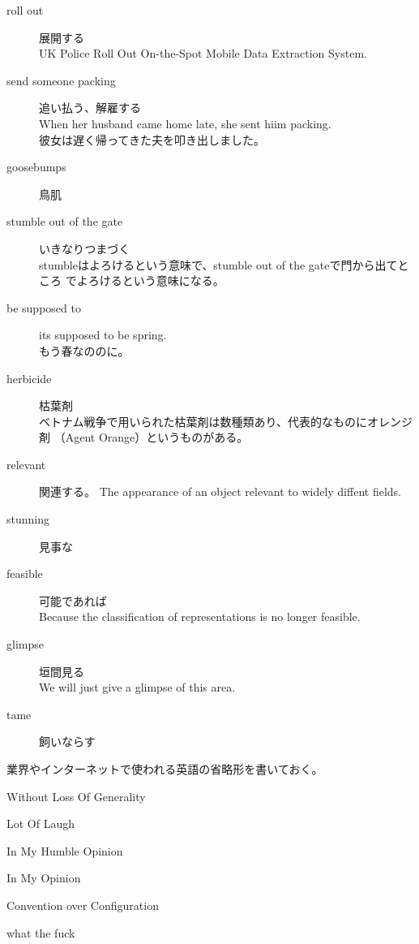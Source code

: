 \begin{description}
		\item[roll out] 展開する \\
		UK Police Roll Out On-the-Spot Mobile Data Extraction System.
		\item[send someone packing] 追い払う、解雇する \\
		When her husband came home late, she sent hiim packing. \\
		彼女は遅く帰ってきた夫を叩き出しました。
		\item[goosebumps] 鳥肌
		\item[stumble out of the gate] いきなりつまづく \\
		stumbleはよろけるという意味で、stumble out of the gateで門から出てところ
		でよろけるという意味になる。
		\item[be supposed to] its supposed to be spring. \\
		もう春なののに。
		\item[herbicide] 枯葉剤 \\
		ベトナム戦争で用いられた枯葉剤は数種類あり、代表的なものにオレンジ剤
		（Agent Orange）というものがある。
		\item[relevant] 関連する。
		The appearance of an object relevant to widely diffent fields.
		\item[stunning] 見事な
		\item[feasible] 可能であれば \\
		Because the classification of representations is no longer feasible.
		\item[glimpse] 垣間見る \\
		We will just give a glimpse of this area.
		\item[tame] 飼いならす \\
	\end{description} %

	業界やインターネットで使われる英語の省略形を書いておく。
	\begin{description}\setlength{\itemsep}{-1mm} %
		\item[WOLOG] Without Loss Of Generality
		\item[LOL] Lot Of Laugh
		\item[IMHO] In My Humble Opinion
		\item[IMO] In My Opinion
		\item[CoC] Convention over Configuration
		\item[WTF] what the fuck
	\end{description} %
